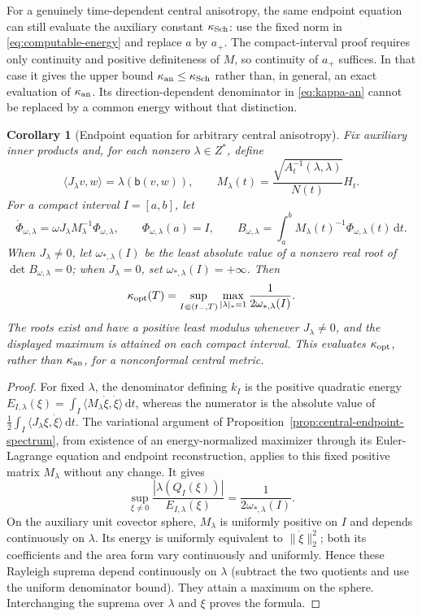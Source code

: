 \documentclass[10pt,a4paper]{article}
\numberwithin{equation}{section}
\newtheorem{corollary}[theorem]{Corollary}
\theoremstyle{definition}
\theoremstyle{remark}
\newcommand{\dd}{\mathrm d}
\begin{document}
For a genuinely time-dependent central anisotropy, the same endpoint
equation can still evaluate the auxiliary constant $\kappa_{\rm Sch}$:
use the fixed norm in \eqref{eq:computable-energy} and replace $a$ by
$a_+$.  The compact-interval proof requires only continuity and positive
definiteness of $M$, so continuity of $a_+$ suffices.  In that case it
gives the upper bound
$\kappa_{\rm an}\le\kappa_{\rm Sch}$ rather than, in general, an exact
evaluation of $\kappa_{\rm an}$.  Its direction-dependent denominator in
\eqref{eq:kappa-an} cannot be replaced by a common energy without that
distinction.

\begin{corollary}[Endpoint equation for arbitrary central anisotropy]
\label{cor:optimal-central-spectrum}
Fix auxiliary inner products and, for each nonzero $\lambda\in Z^*$,
define
\[
 \langle J_\lambda v,w\rangle=\lambda(\mathsf b(v,w)),\qquad
 M_\lambda(t)=\frac{\sqrt{A_t^{-1}(\lambda,\lambda)}}{N(t)}H_t.
\]
For a compact interval $I=[a,b]$, let
\[
 \dot\Phi_{\omega,\lambda}
       =\omega J_\lambda M_\lambda^{-1}\Phi_{\omega,\lambda},
 \qquad \Phi_{\omega,\lambda}(a)=I,
 \qquad
 B_{\omega,\lambda}=
       \int_a^b M_\lambda(t)^{-1}\Phi_{\omega,\lambda}(t)\,\dd t.
\]
When $J_\lambda\ne0$, let $\omega_{*,\lambda}(I)$ be the least
absolute value of a nonzero real root of $\det B_{\omega,\lambda}=0$;
when $J_\lambda=0$, set $\omega_{*,\lambda}(I)=+\infty$.
Then
\[
 \kappa_{\rm opt}(T)=
 \sup_{I\Subset(t_-,T)}\max_{|\lambda|_*=1}
             \frac{1}{2\omega_{*,\lambda}(I)}.
\]
The roots exist and have a positive least modulus whenever
$J_\lambda\ne0$, and the displayed maximum is attained on each
compact interval.  This evaluates $\kappa_{\rm opt}$, rather than
$\kappa_{\rm an}$, for a nonconformal central metric.
\end{corollary}

\begin{proof}
For fixed $\lambda$, the denominator defining $k_I$ is the positive
quadratic energy $E_{I,\lambda}(\xi)=\int_I
\langle M_\lambda\dot\xi,\dot\xi\rangle\,\dd t$, whereas the numerator
is the absolute value of $\frac12\int_I
\langle J_\lambda\xi,\dot\xi\rangle\,\dd t$.
The variational argument of
Proposition~\ref{prop:central-endpoint-spectrum}, from existence of an
energy-normalized maximizer through its Euler-Lagrange equation and
endpoint reconstruction, applies to this fixed positive matrix
$M_\lambda$ without any change.  It gives
\[
 \sup_{\xi\ne0}\frac{|\lambda(Q_I(\xi))|}{E_{I,\lambda}(\xi)}
       =\frac1{2\omega_{*,\lambda}(I)}.
\]
On the auxiliary unit covector sphere, $M_\lambda$ is uniformly positive
on $I$ and depends continuously on $\lambda$.  Its energy is uniformly
equivalent to $\|\dot\xi\|_2^2$; both its coefficients and the area
form vary continuously and uniformly.  Hence these Rayleigh suprema
depend continuously on $\lambda$ (subtract the two quotients and use
the uniform denominator bound).  They attain a maximum on the sphere.
Interchanging the suprema over $\lambda$ and $\xi$ proves the formula.
\end{proof}
\end{document}
